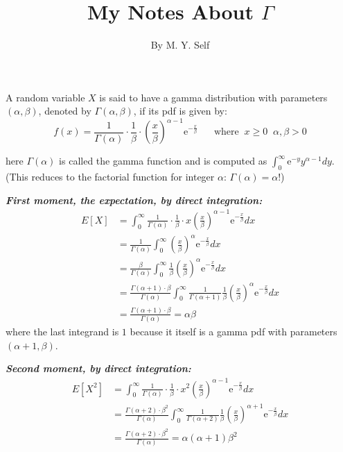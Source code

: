 \documentclass[12pt]{article}
\begin{document}
 \renewcommand{\arraystretch}{1.3}

 
\title{My Notes About $\Gamma$}%
\author{By M. Y. Self} %
 
\maketitle
 A random variable $X$ is said to have a gamma distribution with parameters $(\alpha, \beta)$, denoted by  $\Gamma(\alpha, \beta)$, if its  pdf is given by:
$$
		f(x) = \frac{1}{\Gamma({\alpha})} \cdot \frac{1}{\beta} \cdot  \left( \frac{x}{\beta}\right)^{\alpha - 1} \mathrm{e}^{-\frac{x}{\beta}} \;\;\;\;\;\; \text{where} \;\;  x \ge 0 \;\; \alpha, \beta > 0
$$

here $\Gamma(\alpha)$ is called the gamma function and is computed as $\int_0^{\infty} \mathrm{e}^{-y} y^{\alpha - 1} dy$. (This reduces to the factorial function for integer $\alpha$: $\Gamma(\alpha) = \alpha!$)


\bigskip

 
 \textbf{\color{TealBlue}\emph{First moment, the expectation, by direct integration:} } 
\begin{align*}
E[X] &= \int_0^{\infty}  \frac{1}{\Gamma({\alpha})} \cdot \frac{1}{\beta} \cdot x  \left( \frac{x}{\beta}\right)^{\alpha - 1} \mathrm{e}^{-\frac{x}{\beta}} dx \\
&=   \frac{1}{\Gamma({\alpha})} \int_0^{\infty} \left( \frac{x}{\beta}\right)^{\alpha} \mathrm{e}^{-\frac{x}{\beta}} dx \\
&=   \frac{\beta}{\Gamma({\alpha})} \int_0^{\infty} \frac{1}{\beta} \left( \frac{x}{\beta}\right)^{\alpha} \mathrm{e}^{-\frac{x}{\beta}} dx \\
&=   \frac{ \Gamma({\alpha} + 1) \cdot \beta }{\Gamma({\alpha})} \int_0^{\infty} \frac{1}{\Gamma(\alpha + 1)} \frac{1}{\beta} \left( \frac{x}{\beta}\right)^{\alpha} \mathrm{e}^{-\frac{x}{\beta}} dx \\   
&=  \frac{ \Gamma({\alpha} + 1) \cdot \beta }{\Gamma({\alpha})}  = \alpha\beta
\end{align*}
where the last integrand is $1$ because it itself is a gamma pdf with parameters $(\alpha + 1, \beta)$. 


\bigskip

 \textbf{\color{TealBlue}\emph{Second moment, by direct integration:} } 
\begin{align*}
E[X^2] &= \int_0^{\infty}  \frac{1}{\Gamma({\alpha})} \cdot \frac{1}{\beta} \cdot x^2  \left( \frac{x}{\beta}\right)^{\alpha - 1} \mathrm{e}^{-\frac{x}{\beta}} dx \\
&=   \frac{\Gamma(\alpha + 2) \cdot \beta^2}{\Gamma({\alpha})} \int_0^{\infty} \frac{1}{\Gamma(\alpha + 2)} \frac{1}{\beta} \left( \frac{x}{\beta}\right)^{\alpha +1 } \mathrm{e}^{-\frac{x}{\beta}} dx \\
&=  \frac{ \Gamma({\alpha} + 2) \cdot \beta^2 }{\Gamma({\alpha})}  = \alpha (\alpha + 1) \beta^2
\end{align*}
\end{document}
